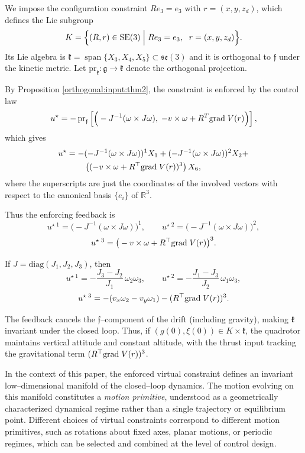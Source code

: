 \documentclass[letterpaper, 10 pt, conference]{ieeeconf}
\newcommand{\R}{\mathbb{R}}
\newcommand{\grad}{\normalfont{\text{grad}}}
\newcommand{\SE}{\normalfont{\text{SE}}}
\begin{document}
We impose the configuration constraint $Re_3=e_3$ with $r=(x,y,z_d)$, which defines the Lie subgroup
\[
K=\Big\{
(R,r)\in \SE(3)\;\Big|\;
R e_3=e_3,\;\ r=(x,y,z_d)
\Big\}.
\]
Its Lie algebra is $\mathfrak{k}
=\operatorname{span}\{X_3,X_4,X_5\}
\subset\mathfrak{se}(3)$ and it is orthogonal to $\mathfrak f$ under the kinetic metric.
Let $\text{pr}_{\mathfrak k}:\mathfrak g\to\mathfrak k$ denote the orthogonal projection.

By Proposition \ref{orthogonal:input:thm2}, the constraint is enforced by the control law
\[
u^\star = -\,\text{pr}_{\mathfrak f} \left[ \Big(-J^{-1}(\omega\times J\omega),\; -v\times\omega + R^{T}\grad \; V(r)\Big) \right],
\]
which gives
\begin{equation*}
    \begin{split}
        u^\star = - & (-J^{-1}(\omega\times J\omega))^1 X_1 + (-J^{-1}(\omega\times J\omega))^2 X_2 + \\
        & \left((-v\times\omega + R^{\top}\grad \; V(r))^3\right)X_6,
    \end{split}
\end{equation*}
where the superscripts are just the coordinates of the involved vectors with respect to the canonical basis $\{e_i\}$ of $\R^{3}$.

Thus the enforcing feedback is
\[
u^{\star \; 1} = \big(-J^{-1}(\omega\times J\omega)\big)^1,
\qquad
u^{\star \; 2} = \big(-J^{-1}(\omega\times J\omega)\big)^2,
\]
\[
u^{\star \; 3} = \big(-v\times\omega + R^{\top}\grad \; V(r)\big)^3.
\]

If $J=\mathrm{diag}(J_1,J_2,J_3)$, then
\[
u^{\star \; 1} = -\frac{J_3-J_2}{J_1}\,\omega_2\omega_3,
\qquad
u^{\star \; 2} = -\frac{J_1-J_3}{J_2}\,\omega_1\omega_3,
\]
\[
u^{\star \; 3} = -(v_x\omega_2 - v_y\omega_1) - (R^{\top} \grad \; V(r))^3.
\]

\medskip

The feedback cancels the $\mathfrak f$--component of the drift 
 (including gravity), making $\mathfrak k$ invariant under the closed loop.  
Thus, if $(g(0),\xi(0))\in K\times\mathfrak k$, the quadrotor maintains vertical 
attitude and constant altitude, with the thrust input tracking the gravitational term 
$(R^{\top} \grad \; V(r))^3$.

In the context of this paper, the enforced virtual constraint defines an invariant low--dimensional manifold of the closed--loop dynamics. The motion evolving on this manifold constitutes a \emph{motion primitive}, understood as a geometrically characterized dynamical regime rather than a single trajectory or equilibrium point. Different choices of virtual constraints correspond to different motion primitives, such as rotations about fixed axes, planar motions, or periodic regimes, which can be selected and combined at the level of control design.
\end{document}
